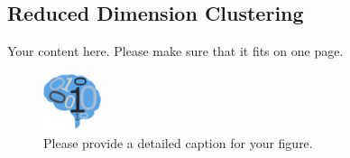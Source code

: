 \documentclass[simplex.tex]{subfiles}
\begin{document}
\subsection{Reduced Dimension Clustering}
Your content here. Please make sure that it fits on one page.

\begin{figure}[!h]
\begin{cframed}
\centering
\includegraphics[width=0.15\textwidth]{neurodata_small.png}
\caption{Please provide a detailed caption for your figure.}
\label{fig:name}
\end{cframed}
\end{figure}
%
%
%
%
%
\end{document}
